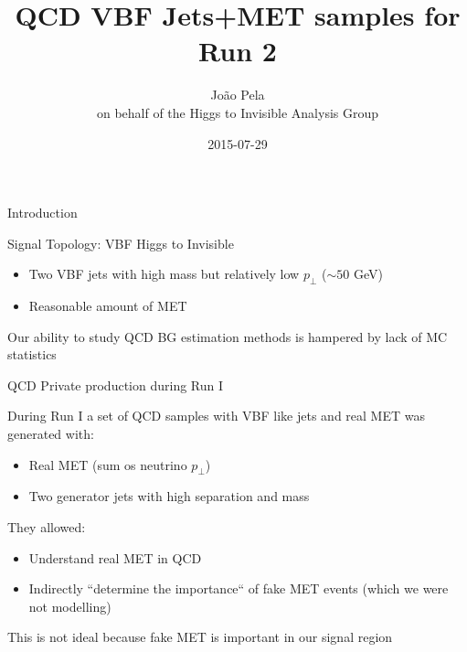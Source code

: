 \documentclass[8pt]{beamer}
\author[J. Pela]{João Pela\\{\fontsize{5}{2}\selectfont on behalf of the Higgs to Invisible Analysis Group}}
\title{QCD VBF Jets+MET samples for Run 2}
\institute[ICL]{Imperial College London}
\date{2015-07-29}
\begin{document}
\setlength{\unitlength}{1mm}

\begin{frame}
  \titlepage
\end{frame}


\begin{frame}{Introduction}
  
\begin{block}{Signal Topology: VBF Higgs to Invisible}
  
\begin{itemize}
  \item Two VBF jets with high mass but relatively low $p_\perp$ ($\sim 50$ GeV)
  \item Reasonable amount of MET
\end{itemize}
  
\end{block}

Our ability to study QCD BG estimation methods is hampered by lack of MC statistics

\begin{block}{QCD Private production during Run I}

During Run I a set of QCD samples with VBF like jets and real MET was generated with:

\begin{itemize}
  \item Real MET (sum os neutrino $p_\perp$)
  \item Two generator jets with high separation and mass
\end{itemize}

They allowed:

\begin{itemize}
  \item Understand real MET in QCD
  \item Indirectly ``determine the importance`` of fake MET events (which we were not modelling)
\end{itemize}
  
\end{block}

\begin{center}
This is not ideal because fake MET is important in our signal region
\end{center}

\end{frame}
\end{document}
